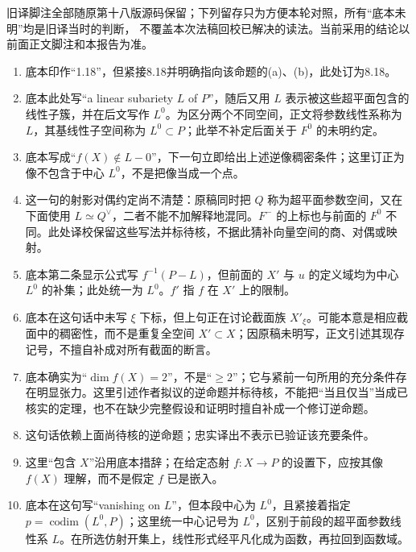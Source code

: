 旧译脚注全部随原第十八版源码保留；下列留存只为方便本轮对照，所有“底本未明”均是旧译当时的判断，
不覆盖本次法稿回校已解决的读法。当前采用的结论以前面正文脚注和本报告为准。
\begin{enumerate}
\item 底本印作“1.18”，但紧接8.18并明确指向该命题的(a)、(b)，此处订为8.18。

\item 底本此处写“a linear subariety $L$ of $P$”，随后又用 $L$ 表示被这些超平面包含的线性子簇，并在后文写作 $L^0$。为区分两个不同空间，正文将参数线性系称为 $L$，其基线性子空间称为 $L^0\subset P$；此举不补定后面关于 $F^0$ 的未明约定。

\item 底本写成“$f(X)\notin L-0$”，下一句立即给出上述逆像稠密条件；这里订正为像不包含于中心 $L^0$，不是把像当成一个点。

\item 这一句的射影对偶约定尚不清楚：原稿同时把 $Q$ 称为超平面参数空间，又在下面使用 $L\simeq Q^\vee$，二者不能不加解释地混同。$F^-$ 的上标也与前面的 $F^0$ 不同。此处译校保留这些写法并标待核，不据此猜补向量空间的商、对偶或映射。

\item 底本第二条显示公式写 $f^{-1}(P-L)$，但前面的 $X'$ 与 $u$ 的定义域均为中心 $L^0$ 的补集；此处统一为 $L^0$。$f'$ 指 $f$ 在 $X'$ 上的限制。

\item 底本在这句话中未写 $\xi$ 下标，但上句正在讨论截面族 $X'_\xi$。可能本意是相应截面中的稠密性，而不是重复全空间 $X'\subset X$；因原稿未明写，正文引述其现存记号，不擅自补成对所有截面的断言。

\item 底本确实为“$\dim f(X)=2$”，不是“$\ge2$”；它与紧前一句所用的充分条件存在明显张力。这里引述作者拟议的逆命题并标待核，不能把“当且仅当”当成已核实的定理，也不在缺少完整假设和证明时擅自补成一个修订逆命题。

\item 这句话依赖上面尚待核的逆命题；忠实译出不表示已验证该充要条件。

\item 这里“包含 $X$”沿用底本措辞；在给定态射 $f:X\to P$ 的设置下，应按其像 $f(X)$ 理解，而不是假定 $f$ 已是嵌入。

\item 底本在这句写“vanishing on $L$”，但本段中心为 $L^0$，且紧接着指定 $p=\operatorname{codim}(L^0,P)$；这里统一中心记号为 $L^0$，区别于前段的超平面参数线性系 $L$。在所选仿射开集上，线性形式经平凡化成为函数，再拉回到函数域。


\end{enumerate}
